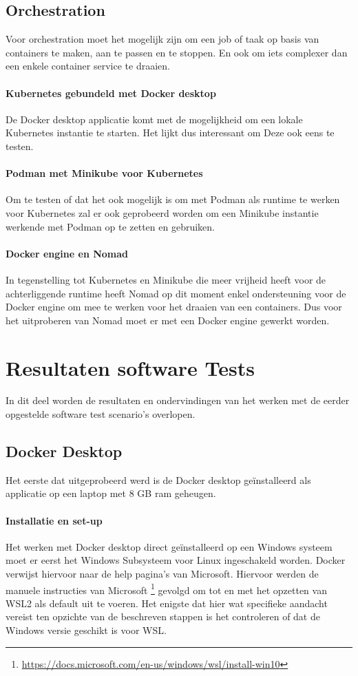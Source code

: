 \subsection{Orchestration}
Voor orchestration moet het mogelijk zijn om een job of taak op basis van containers te maken, aan te passen en te stoppen. En ook om iets complexer dan een enkele container service te draaien.

\paragraph{Kubernetes gebundeld met Docker desktop}
De Docker desktop applicatie komt met de mogelijkheid om een lokale Kubernetes instantie te starten. Het lijkt dus interessant om Deze ook eens te testen.

\paragraph{Podman met Minikube voor Kubernetes}
Om te testen of dat het ook mogelijk is om met Podman als runtime te werken voor Kubernetes zal er ook geprobeerd worden om een Minikube instantie werkende met Podman op te zetten en gebruiken.

\paragraph{Docker engine en Nomad}
In tegenstelling tot Kubernetes en Minikube die meer vrijheid heeft voor de achterliggende runtime heeft Nomad op dit moment enkel ondersteuning voor de Docker engine om mee te werken voor het draaien van een containers. Dus voor het uitproberen van Nomad moet er met een Docker engine gewerkt worden.

\section{Resultaten software Tests}
In dit deel worden de resultaten en ondervindingen van het werken met de eerder opgestelde software test scenario’s overlopen. 

\subsection{Docker Desktop}
Het eerste dat uitgeprobeerd werd is de Docker desktop geïnstalleerd als applicatie op een laptop met 8 GB ram geheugen.

\paragraph{Installatie en set-up}
Het werken met Docker desktop direct geïnstalleerd op een Windows systeem moet er eerst het Windows Subsysteem voor Linux ingeschakeld worden. Docker verwijst hiervoor naar de help pagina’s van Microsoft. Hiervoor werden de manuele instructies van Microsoft \footnote{\url{https://docs.microsoft.com/en-us/windows/wsl/install-win10}} gevolgd om tot en met het opzetten van WSL2 als default uit te voeren. Het enigste dat hier wat specifieke aandacht vereist ten opzichte van de beschreven stappen is het controleren of dat de Windows versie geschikt is voor WSL.

